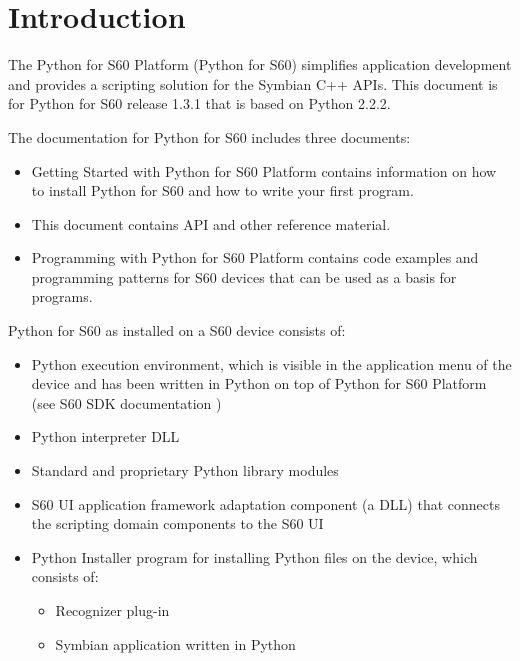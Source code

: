 %
%
%

\chapter{Introduction}
\label{intro}

The Python for S60 Platform (Python for S60) simplifies 
application development and provides a scripting solution for the Symbian 
C++ APIs. This document is for Python for S60 release 1.3.1 that is 
based on Python 2.2.2.

The documentation for Python for S60 includes three documents:

\begin{itemize}
\item Getting Started with Python for S60 Platform \cite{PyS60Start} contains information on how to install Python for S60 and how to write your first program.
\item This document contains API and other reference material.
\item Programming with Python for S60 Platform \cite{PyS60Prog} contains code examples and programming patterns for S60 devices that can be used as a basis for programs.
\end{itemize}
Python for S60 as installed on a S60 device consists of:

\begin{itemize}
\item Python execution environment, which is visible in the application menu of the device and has been written in Python on top of Python for S60 Platform (see S60 SDK documentation \cite{S60Doc})
\item Python interpreter DLL
\item Standard and proprietary Python library modules
\item S60 UI application framework adaptation component (a DLL) that connects the scripting domain components to the S60 UI
\item Python Installer program for installing Python files on the device, which consists of:
	\begin{itemize}
	\item Recognizer plug-in
	\item Symbian application written in Python
	\end{itemize}
\end{itemize}

